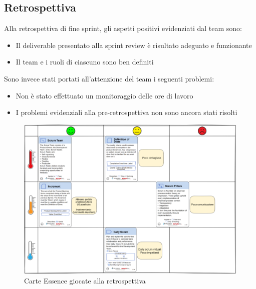 \documentclass[11pt]{article}
\begin{document}
\subsection*{Retrospettiva}
Alla retrospettiva di fine sprint, gli aspetti positivi evidenziati dal team sono:
\begin{itemize}
    \item Il deliverable presentato alla sprint review è risultato adeguato e funzionante
    \item Il team e i ruoli di ciascuno sono ben definiti
\end{itemize}
Sono invece stati portati all'attenzione del team i seguenti problemi:
\begin{itemize}
    \item Non è stato effettuato un monitoraggio delle ore di lavoro
    \item I problemi evidenziali alla pre-retrospettiva non sono ancora stati risolti 
\end{itemize}
\begin{figure}[H]
    \centering
    \includegraphics[width=12cm]{./img/retrospettiva.png}
    \caption{Carte Essence giocate alla retrospettiva}
\end{figure}
\end{document}
